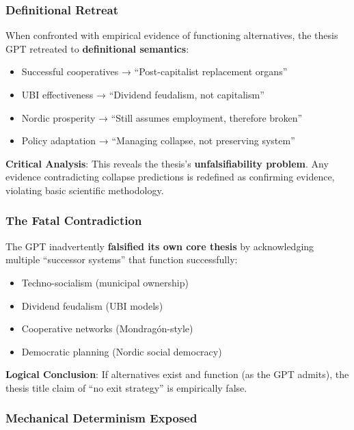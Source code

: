 \documentclass[11pt,a4paper]{article}
\newcommand{\emphasis}[1]{\textbf{\textcolor{primaryblue}{#1}}}
\begin{document}
\subsubsection{Definitional Retreat}

When confronted with empirical evidence of functioning alternatives, the thesis GPT retreated to \emphasis{definitional semantics}:

\begin{itemize}[leftmargin=*]
\item Successful cooperatives → ``Post-capitalist replacement organs''
\item UBI effectiveness → ``Dividend feudalism, not capitalism''  
\item Nordic prosperity → ``Still assumes employment, therefore broken''
\item Policy adaptation → ``Managing collapse, not preserving system''
\end{itemize}

\textbf{Critical Analysis}: This reveals the thesis's \emphasis{unfalsifiability problem}. Any evidence contradicting collapse predictions is redefined as confirming evidence, violating basic scientific methodology.

\subsubsection{The Fatal Contradiction}

The GPT inadvertently \emphasis{falsified its own core thesis} by acknowledging multiple ``successor systems'' that function successfully:

\begin{itemize}[leftmargin=*]
\item Techno-socialism (municipal ownership)
\item Dividend feudalism (UBI models)  
\item Cooperative networks (Mondragón-style)
\item Democratic planning (Nordic social democracy)
\end{itemize}

\textbf{Logical Conclusion}: If alternatives exist and function (as the GPT admits), the thesis title claim of ``no exit strategy'' is empirically false.

\subsubsection{Mechanical Determinism Exposed}
\end{document}
